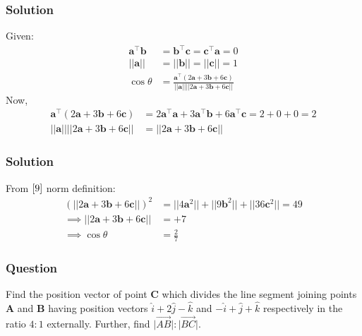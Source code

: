 \documentclass{beamer}
\providecommand{\brak}[1]{\ensuremath{\left(#1\right)}}
\theoremstyle{remark}
\let\vec\mathbf
\begin{document}
%
\begin{frame}
\frametitle{Solution}
Given:
\begin{align}
    \vec{a}^{\top}\vec{b} &=  \vec{b}^{\top}\vec{c} =  \vec{c}^{\top}\vec{a} = 0\\
    \lvert \lvert \vec{a} \rvert \rvert 
&= \lvert \lvert \vec{b} \rvert \rvert = \lvert \lvert \vec{c} \rvert \rvert = 1\\
\cos{\theta} &= \frac{\vec{a}^{\top}\brak{2\vec{a}+3\vec{b}+6\vec{c}}}{\lvert \lvert \vec{a} \rvert \rvert \lvert \lvert 2\vec{a} + 3\vec{b} + 6\vec{c} \rvert \rvert}
\end{align}
Now,
\begin{align}
    \vec{a}^{\top}\brak{2\vec{a}+3\vec{b}+6\vec{c}} &= 2\vec{a}^{\top}\vec{a} + 3\vec{a}^{\top}\vec{b} + 6\vec{a}^{\top}\vec{c} = 2 + 0 + 0 = 2\\
    \lvert \lvert \vec{a} \rvert \rvert \lvert \lvert 2\vec{a} + 3\vec{b} + 6\vec{c} \rvert \rvert &= \lvert \lvert 2\vec{a} + 3\vec{b} + 6\vec{c} \rvert \rvert
    \end{align}
\end{frame}









\begin{frame}
\frametitle{Solution}
From $\eqref{9}$ norm definition:
    \begin{align}
        \brak{\lvert \lvert 2\vec{a} + 3\vec{b} + 6\vec{c} \rvert \rvert}^2 &= \lvert \lvert 4\vec{a}^2 \rvert \rvert + \lvert \lvert 9\vec{b}^2 \rvert \rvert + \lvert \lvert 36\vec{c}^2  \rvert \rvert = 49\\
    \implies \lvert \lvert 2\vec{a} + 3\vec{b} + 6\vec{c} \rvert \rvert &= +7\\
    \implies \cos{\theta} &= \frac{2}{7}
\end{align}
    
\end{frame}







\begin{frame}
\frametitle{Question }
Find the position vector of point $\vec{C}$ which divides the line segment joining points $\vec{A}$ and $\vec{B}$ having position vectors $\hat{i} + 2\hat{j} - \hat{k}$ and $-\hat{i} + \hat{j} + \hat{k}$ respectively in the ratio $4:1$ externally. Further, find $\lvert \overrightarrow{AB}\rvert : \lvert \overrightarrow{BC} \rvert$. 
\end{frame}
\end{document}
